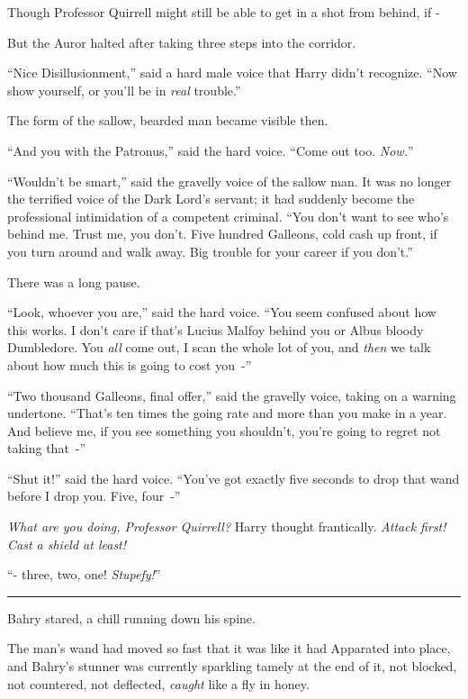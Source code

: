 Though Professor Quirrell might still be able to get in a shot from behind, if -

But the Auror halted after taking three steps into the corridor.

``Nice Disillusionment,'' said a hard male voice that Harry didn't recognize. ``Now show yourself, or you'll be in \emph{real} trouble.''

The form of the sallow, bearded man became visible then.

``And you with the Patronus,'' said the hard voice. ``Come out too. \emph{Now.}''

``Wouldn't be smart,'' said the gravelly voice of the sallow man. It was no longer the terrified voice of the Dark Lord's servant; it had suddenly become the professional intimidation of a competent criminal. ``You don't want to see who's behind me. Trust me, you don't. Five hundred Galleons, cold cash up front, if you turn around and walk away. Big trouble for your career if you don't.''

There was a long pause.

``Look, whoever you are,'' said the hard voice. ``You seem confused about how this works. I don't care if that's Lucius Malfoy behind you or Albus bloody Dumbledore. You \emph{all} come out, I scan the whole lot of you, and \emph{then} we talk about how much this is going to cost you~-''

``Two thousand Galleons, final offer,'' said the gravelly voice, taking on a warning undertone. ``That's ten times the going rate and more than you make in a year. And believe me, if you see something you shouldn't, you're going to regret not taking that~-''

``Shut it!'' said the hard voice. ``You've got exactly five seconds to drop that wand before I drop you. Five, four~-''

\emph{What are you doing, Professor Quirrell?} Harry thought frantically. \emph{Attack first! Cast a shield at least!}

``- three, two, one! \emph{Stupefy!}''

\begin{center}\rule{3in}{0.4pt}\end{center}

Bahry stared, a chill running down his spine.

The man's wand had moved so fast that it was like it had Apparated into place, and Bahry's stunner was currently sparkling tamely at the end of it, not blocked, not countered, not deflected, \emph{caught} like a fly in honey.

